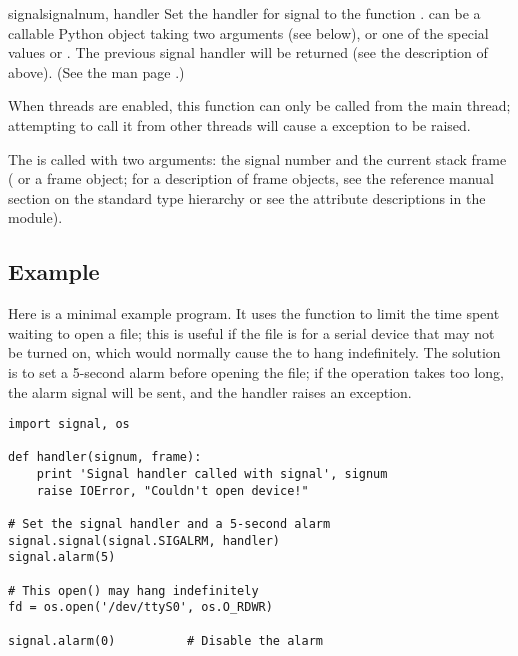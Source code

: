 \begin{funcdesc}{signal}{signalnum, handler}
  Set the handler for signal  to the function
  .   can be a callable Python object
  taking two arguments (see below), or
  one of the special values  or
  .  The previous signal handler will be returned
  (see the description of  above).  (See the
  \UNIX{} man page .)

  When threads are enabled, this function can only be called from the
  main thread; attempting to call it from other threads will cause a
   exception to be raised.

  The  is called with two arguments: the signal number
  and the current stack frame ( or a frame object;
  for a description of frame objects, see the reference manual section
  on the standard type hierarchy or see the attribute descriptions in
  the  module).
\end{funcdesc}

\subsection{Example}

Here is a minimal example program. It uses the 
function to limit the time spent waiting to open a file; this is
useful if the file is for a serial device that may not be turned on,
which would normally cause the  to hang
indefinitely.  The solution is to set a 5-second alarm before opening
the file; if the operation takes too long, the alarm signal will be
sent, and the handler raises an exception.

\begin{verbatim}
import signal, os

def handler(signum, frame):
    print 'Signal handler called with signal', signum
    raise IOError, "Couldn't open device!"

# Set the signal handler and a 5-second alarm
signal.signal(signal.SIGALRM, handler)
signal.alarm(5)

# This open() may hang indefinitely
fd = os.open('/dev/ttyS0', os.O_RDWR)  

signal.alarm(0)          # Disable the alarm
\end{verbatim}
